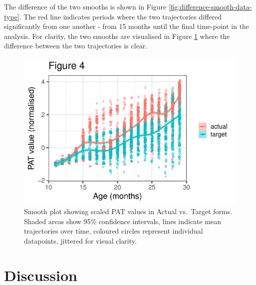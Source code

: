 \documentclass[
  man]{apa6}
\begin{document}
The difference of the two smooths is shown in Figure \ref{fig:difference-smooth-data-type}. The red line indicates periods where the two trajectories differed significantly from one another - from 15 months until the final time-point in the analysis. For clarity, the two smooths are visualised in Figure \ref{fig:plotted-smooth-data-type} where the difference between the two trajectories is clear.

\begin{figure}
\centering
\includegraphics{PhonNetworksProj_files/figure-latex/plotted-smooth-data-type-1.pdf}
\caption{\label{fig:plotted-smooth-data-type}Smooth plot showing scaled PAT values in Actual vs.~Target forms. Shaded areas show 95\% confidence intervals, lines indicate mean trajectories over time, coloured circles represent individual datapoints, jittered for visual clarity.}
\end{figure}

\hypertarget{discussion}{%
\section{Discussion}\label{discussion}}
\end{document}
